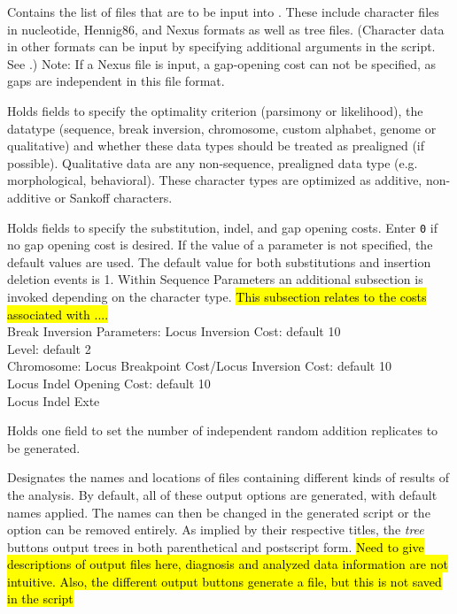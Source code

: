 \begin{description}
\setlength{\labelsep}{5pt}
\setlength{\itemindent}{0pt}%
    \item[Input Files]
        Contains the list of files that are to be input into \poy. These include
        character files in nucleotide, Hennig86, and Nexus formats as well as tree files. (Character data in other formats can be input by specifying additional arguments in the script. See .) Note: If a Nexus file is input, a gap-opening cost can not be specified, as gaps are independent in this file format.
    \item[Input Parameters]
    	Holds fields to specify the optimality criterion (parsimony or likelihood), the datatype (sequence, break inversion, chromosome, custom alphabet, genome or qualitative) and whether these data types should be treated as prealigned (if possible).  Qualitative data are any non-sequence, prealigned data type (e.g. morphological, behavioral).  These character types are optimized as additive, non-additive or Sankoff characters.
    \item[Sequence Parameters]
        Holds fields to specify the substitution, indel, and gap opening costs. Enter \texttt{0} if no
        gap opening cost is desired. If the value of a parameter is not specified, the default values are used. The default value for both substitutions and insertion deletion events is 1. Within Sequence Parameters an additional subsection is invoked depending on the character type.  \hl{This subsection relates to the costs associated with ....}\\
        Break Inversion Parameters: 	Locus Inversion Cost: default 10\\
        							Level: default 2\\
        Chromosome: 	Locus Breakpoint Cost/Locus Inversion Cost: default 10\\
        				Locus Indel Opening Cost: default 10\\
				Locus Indel Exte\\
        
    \item[Search Parameters]
        Holds one field to set the number of independent random addition replicates to be generated.
    \item[Output Files]
        Designates the names and locations of files containing different kinds of results of the analysis. 
By default, all of these output options are generated, with default names applied.  The names can then be changed 
in the generated script or the option can be removed entirely.  As implied by their respective titles, the \emph{tree} 
buttons output trees in both parenthetical and postscript form.
        \hl{Need to give descriptions of output files here, diagnosis and analyzed data information are not intuitive.
        Also, the different output buttons generate a file, but this is not saved in the script}
\end{description}

